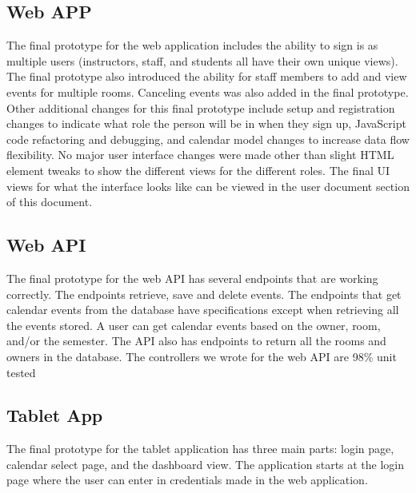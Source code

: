 \subsection{Web APP}
The final prototype for the web application includes the ability to sign is as multiple users (instructors, staff, and students all have their own unique views). The final prototype also introduced the ability for staff members to add and view events for multiple rooms. Canceling events was also added in the final prototype. Other additional changes for this final prototype include setup and registration changes to indicate what role the person will be in when they sign up, JavaScript code refactoring and debugging, and calendar model changes to increase data flow flexibility. No major user interface changes were made other than slight HTML element tweaks to show the different views for the different roles. The final UI views for what the interface looks like can be viewed in the user document section of this document. 

\subsection{Web API}
The final prototype for the web API has several endpoints that are working correctly. The endpoints retrieve, save and delete events. The endpoints that get calendar events from the database have specifications except when retrieving all the events stored. A user can get calendar events based on the owner, room, and/or the semester. The API also has endpoints to return all the rooms and owners in the database. The controllers we wrote for the web API are 98\% unit tested

\subsection{Tablet App}
The final prototype for the tablet application has three main parts: login page, calendar select page, and the dashboard view.  The application starts at the login page where the user can enter in credentials made in the web application.  

